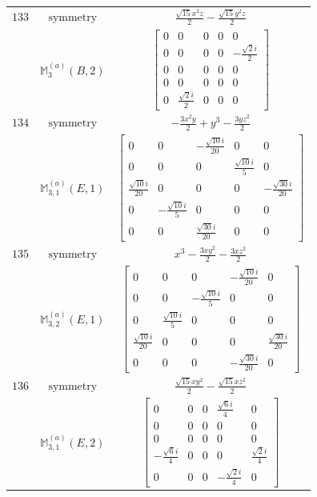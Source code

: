 \documentclass[fleqn,8pt,landscape]{jsarticle}
\begin{document}
\begin{longtable}{ccc}
$ 133 $ & $ \text{symmetry} $ & $ \frac{\sqrt{15} x^{2} z}{2} - \frac{\sqrt{15} y^{2} z}{2} $ \\
$  $ & $ \mathbb{M}_{3}^{(a)}(B,2) $ & $ \begin{bmatrix} 0 & 0 & 0 & 0 & 0 \\ 0 & 0 & 0 & 0 & - \frac{\sqrt{2} i}{2} \\ 0 & 0 & 0 & 0 & 0 \\ 0 & 0 & 0 & 0 & 0 \\ 0 & \frac{\sqrt{2} i}{2} & 0 & 0 & 0 \end{bmatrix} $ \\ \hline
$ 134 $ & $ \text{symmetry} $ & $ - \frac{3 x^{2} y}{2} + y^{3} - \frac{3 y z^{2}}{2} $ \\
$  $ & $ \mathbb{M}_{3,1}^{(a)}(E,1) $ & $ \begin{bmatrix} 0 & 0 & - \frac{\sqrt{10} i}{20} & 0 & 0 \\ 0 & 0 & 0 & \frac{\sqrt{10} i}{5} & 0 \\ \frac{\sqrt{10} i}{20} & 0 & 0 & 0 & - \frac{\sqrt{30} i}{20} \\ 0 & - \frac{\sqrt{10} i}{5} & 0 & 0 & 0 \\ 0 & 0 & \frac{\sqrt{30} i}{20} & 0 & 0 \end{bmatrix} $ \\ \hline
$ 135 $ & $ \text{symmetry} $ & $ x^{3} - \frac{3 x y^{2}}{2} - \frac{3 x z^{2}}{2} $ \\
$  $ & $ \mathbb{M}_{3,2}^{(a)}(E,1) $ & $ \begin{bmatrix} 0 & 0 & 0 & - \frac{\sqrt{10} i}{20} & 0 \\ 0 & 0 & - \frac{\sqrt{10} i}{5} & 0 & 0 \\ 0 & \frac{\sqrt{10} i}{5} & 0 & 0 & 0 \\ \frac{\sqrt{10} i}{20} & 0 & 0 & 0 & \frac{\sqrt{30} i}{20} \\ 0 & 0 & 0 & - \frac{\sqrt{30} i}{20} & 0 \end{bmatrix} $ \\ \hline
$ 136 $ & $ \text{symmetry} $ & $ \frac{\sqrt{15} x y^{2}}{2} - \frac{\sqrt{15} x z^{2}}{2} $ \\
$  $ & $ \mathbb{M}_{3,1}^{(a)}(E,2) $ & $ \begin{bmatrix} 0 & 0 & 0 & \frac{\sqrt{6} i}{4} & 0 \\ 0 & 0 & 0 & 0 & 0 \\ 0 & 0 & 0 & 0 & 0 \\ - \frac{\sqrt{6} i}{4} & 0 & 0 & 0 & \frac{\sqrt{2} i}{4} \\ 0 & 0 & 0 & - \frac{\sqrt{2} i}{4} & 0 \end{bmatrix} $ \\ \hline

\end{longtable}
\end{document}
